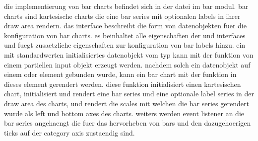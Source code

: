 die implementierung von bar charts befindet sich in der  datei im bar modul. 
bar charts sind kartesische charts die eine bar series mit optionalen labels in ihrer draw area rendern.
das  interface beschreibt die form von datenobjekten fuer die konfiguration von bar charts.
es beinhaltet alle eigenschaften der  und  interfaces und fuegt zusaetzliche eigenschaften zur konfiguration von bar labels hinzu. 
ein mit standardwerten initialisiertes datenobjekt vom typ  kann mit der  funktion von einem partiellen input objekt erzeugt werden.
nachdem solch ein datenobjekt auf einem  oder  element gebunden wurde, kann ein bar chart mit der  funktion in dieses element gerendert werden.
diese funktion initialisiert einen kartesischen chart, initialisiert und rendert eine bar series und eine optionale label series in der draw area des charts, und rendert die scales mit welchen die bar series gerendert wurde als left und bottom axes des charts. 
weiters werden  event listener an die bar series angehaengt die fuer das hervorheben von bars und den dazugehoerigen ticks auf der category axis zustaendig sind.

